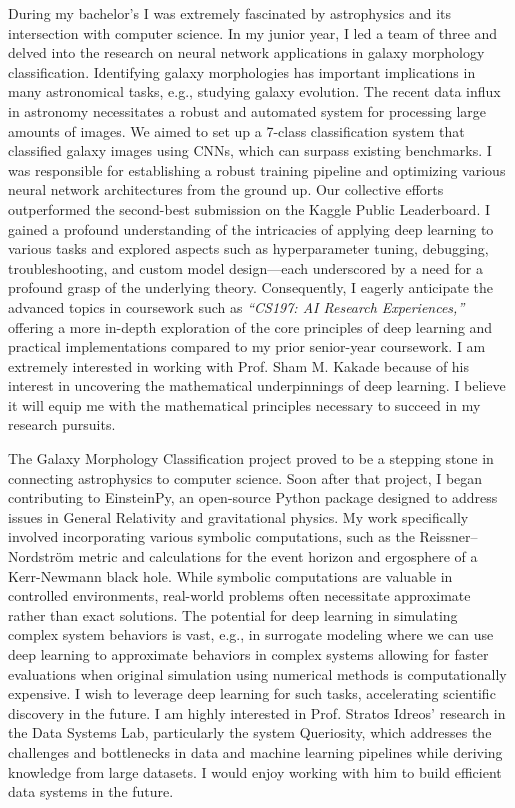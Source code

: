\documentclass{article}
\begin{document}
During my bachelor’s I was extremely fascinated by astrophysics and its
intersection with computer science. In my junior year, I led a team of three and
delved into the research on neural network applications in galaxy morphology
classification. Identifying galaxy morphologies has important implications in
many astronomical tasks, e.g., studying galaxy evolution. The recent data influx
in astronomy necessitates a robust and automated system for processing large
amounts of images. We aimed to set up a 7-class classification system that
classified galaxy images using CNNs, which can surpass existing benchmarks. I
was responsible for establishing a robust training pipeline and optimizing
various neural network architectures from the ground up. Our collective efforts
outperformed the second-best submission on the Kaggle Public Leaderboard. I
gained a profound understanding of the intricacies of applying deep learning to
various tasks and explored aspects such as hyperparameter tuning, debugging,
troubleshooting, and custom model design—each underscored by a need for a
profound grasp of the underlying theory. Consequently, I eagerly anticipate the
advanced topics in coursework such as \textit{“CS197: AI Research Experiences,”} offering
a more in-depth exploration of the core principles of deep learning and
practical implementations compared to my prior senior-year coursework. I am
extremely interested in working with Prof. Sham M. Kakade because of his
interest in uncovering the mathematical underpinnings of deep learning. I
believe it will equip me with the mathematical principles necessary to succeed
in my research pursuits.

The Galaxy Morphology Classification project proved to be a stepping stone in
connecting astrophysics to computer science. Soon after that project, I began
contributing to EinsteinPy, an open-source Python package designed to address
issues in General Relativity and gravitational physics. My work specifically
involved incorporating various symbolic computations, such as the
Reissner–Nordström metric and calculations for the event horizon and ergosphere
of a Kerr-Newmann black hole. While symbolic computations are valuable in
controlled environments, real-world problems often necessitate approximate
rather than exact solutions. The potential for deep learning in simulating
complex system behaviors is vast, e.g., in surrogate modeling where we can use
deep learning to approximate behaviors in complex systems allowing for faster
evaluations when original simulation using numerical methods is computationally
expensive. I wish to leverage deep learning for such tasks, accelerating
scientific discovery in the future. I am highly interested in Prof. Stratos
Idreos’ research in the Data Systems Lab, particularly the system Queriosity,
which addresses the challenges and bottlenecks in data and machine learning
pipelines while deriving knowledge from large datasets. I would enjoy working
with him to build efficient data systems in the future.
\end{document}
